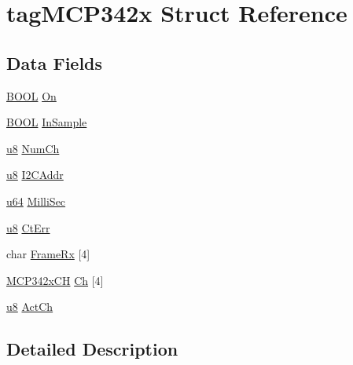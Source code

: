 \hypertarget{structtag_m_c_p342x}{\section{tag\-M\-C\-P342x Struct Reference}
\label{structtag_m_c_p342x}
}
\subsection*{Data Fields}
\begin{DoxyCompactItemize}
\item 
\hyperlink{p8_2pinguino_2core_2typedef_8h_a67bb6a3d7ee6a2a5950ce437abbe31c8}{B\-O\-O\-L} \hyperlink{structtag_m_c_p342x_a2d1f06ea4f608600e241eeded488b0df}{On}
\item 
\hyperlink{p8_2pinguino_2core_2typedef_8h_a67bb6a3d7ee6a2a5950ce437abbe31c8}{B\-O\-O\-L} \hyperlink{structtag_m_c_p342x_a134d70693df6521dd8d693f79a14737e}{In\-Sample}
\item 
\hyperlink{p8_2pinguino_2core_2typedef_8h_aed742c436da53c1080638ce6ef7d13de}{u8} \hyperlink{structtag_m_c_p342x_a0205dd711b1cc7c32042fe54634bfe84}{Num\-Ch}
\item 
\hyperlink{p8_2pinguino_2core_2typedef_8h_aed742c436da53c1080638ce6ef7d13de}{u8} \hyperlink{structtag_m_c_p342x_a525e929bfd993f97bf03022b3d01e334}{I2\-C\-Addr}
\item 
\hyperlink{p32_2include_2pinguino_2core_2typedef_8h_ad758b7a5c3f18ed79d2fcd23d9f16357}{u64} \hyperlink{structtag_m_c_p342x_a8421761e0e1b887991b4192078254bcf}{Milli\-Sec}
\item 
\hyperlink{p8_2pinguino_2core_2typedef_8h_aed742c436da53c1080638ce6ef7d13de}{u8} \hyperlink{structtag_m_c_p342x_a0577a7cb96b0af0dda91c4efe1150643}{Ct\-Err}
\item 
char \hyperlink{structtag_m_c_p342x_a1f30f05b6ad09b1daa7195f6ec245656}{Frame\-Rx} \mbox{[}4\mbox{]}
\item 
\hyperlink{_m_c_p342x_8c_ac8d1971fbd29c07099b21723634185ff}{M\-C\-P342x\-C\-H} \hyperlink{structtag_m_c_p342x_ac430268b4a9aeacbabc611343812e308}{Ch} \mbox{[}4\mbox{]}
\item 
\hyperlink{p8_2pinguino_2core_2typedef_8h_aed742c436da53c1080638ce6ef7d13de}{u8} \hyperlink{structtag_m_c_p342x_a5409b7b9c64e9f1f92d6aa5f39152103}{Act\-Ch}
\end{DoxyCompactItemize}


\subsection{Detailed Description}


